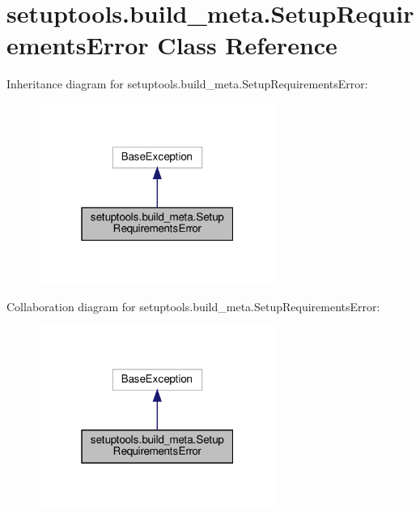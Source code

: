 \hypertarget{classsetuptools_1_1build__meta_1_1SetupRequirementsError}{}\section{setuptools.\+build\+\_\+meta.\+Setup\+Requirements\+Error Class Reference}
\label{classsetuptools_1_1build__meta_1_1SetupRequirementsError}


Inheritance diagram for setuptools.\+build\+\_\+meta.\+Setup\+Requirements\+Error\+:
\nopagebreak
\begin{figure}[H]
\begin{center}
\leavevmode
\includegraphics[width=220pt]{classsetuptools_1_1build__meta_1_1SetupRequirementsError__inherit__graph}
\end{center}
\end{figure}


Collaboration diagram for setuptools.\+build\+\_\+meta.\+Setup\+Requirements\+Error\+:
\nopagebreak
\begin{figure}[H]
\begin{center}
\leavevmode
\includegraphics[width=220pt]{classsetuptools_1_1build__meta_1_1SetupRequirementsError__coll__graph}
\end{center}
\end{figure}
